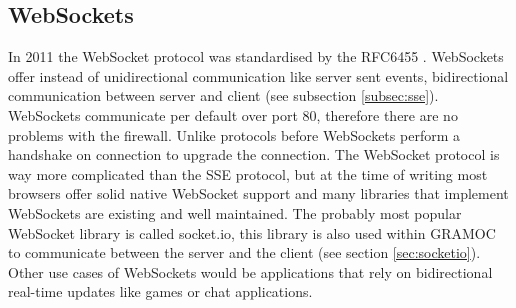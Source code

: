 \subsection{WebSockets}
In 2011 the WebSocket protocol was standardised by the RFC6455 \autocite{rfc6455}. WebSockets offer instead of unidirectional communication like server sent events, bidirectional communication between server and client (see subsection \vref{subsec:sse}). WebSockets communicate per default over port 80, therefore there are no problems with the firewall. Unlike protocols before WebSockets perform a handshake on connection to upgrade the connection. The WebSocket protocol is way more complicated than the SSE protocol, but at the time of writing most browsers offer solid native WebSocket support and many libraries that implement WebSockets are existing and well maintained. The probably most popular WebSocket library is called socket.io, this library is also used within GRAMOC to communicate between the server and the client (see section \vref{sec:socketio}). Other use cases of WebSockets would be applications that rely on bidirectional real-time updates like games or chat applications.

